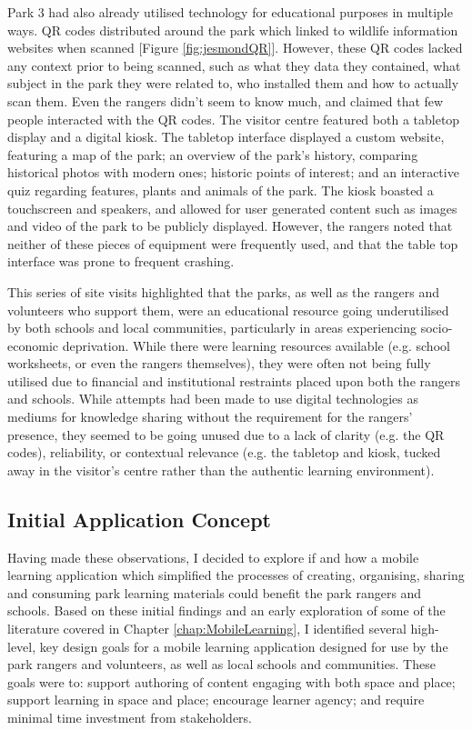 Park 3 had also already utilised technology for educational purposes in multiple ways. QR codes distributed around the park which linked to wildlife information websites when scanned [Figure \ref{fig:jesmondQR}]. However, these QR codes lacked any context prior to being scanned, such as what they data they contained, what subject in the park they were related to, who installed them and how to actually scan them. Even the rangers didn't seem to know much, and claimed that few people interacted with the QR codes. The visitor centre featured both a tabletop display and a digital kiosk. The tabletop interface displayed a custom website, featuring a map of the park; an overview of the park's history, comparing historical photos with modern ones; historic points of interest; and an interactive quiz regarding features, plants and animals of the park. The kiosk boasted a touchscreen and speakers, and allowed for user generated content such as images and video of the park to be publicly displayed. However, the rangers noted that neither of these pieces of equipment were frequently used, and that the table top interface was prone to frequent crashing.

This series of site visits highlighted that the parks, as well as the rangers and volunteers who support them, were an educational resource going underutilised by both schools and local communities, particularly in areas experiencing socio-economic deprivation. While there were learning resources available (e.g. school worksheets, or even the rangers themselves), they were often not being fully utilised due to financial and institutional restraints placed upon both the rangers and schools. While attempts had been made to use digital technologies as mediums for knowledge sharing without the requirement for the rangers' presence, they seemed to be going unused due to a lack of clarity (e.g. the QR codes), reliability, or contextual relevance (e.g. the tabletop and kiosk, tucked away in the visitor's centre rather than the authentic learning environment).

\subsection{Initial Application Concept}

Having made these observations, I decided to explore if and how a mobile learning application which simplified the processes of creating, organising, sharing and consuming park learning materials could benefit the park rangers and schools. Based on these initial findings and an early exploration of some of the literature covered in Chapter \ref{chap:MobileLearning}, I identified several high-level, key design goals for a mobile learning application designed for use by the park rangers and volunteers, as well as local schools and communities. These goals were to: support authoring of content engaging with both space and place; support learning in space and place; encourage learner agency; and require minimal time investment from stakeholders. 

